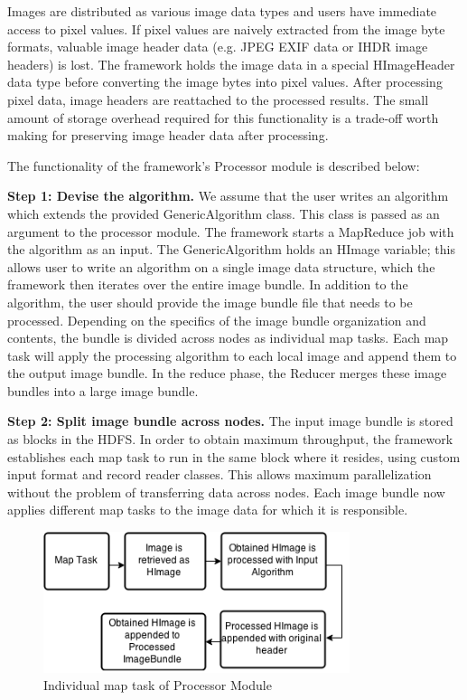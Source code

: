 \documentclass{osuthesis}
\begin{document}
				Images are distributed as various image data types and users have
				immediate access to pixel values.  If pixel values are naively
				extracted from the image byte formats, valuable image header data
				(e.g. JPEG EXIF data or IHDR \cite{David03} image headers) is
				lost. The framework holds the image data in a special HImageHeader
				data type before converting the image bytes into pixel values.  After
				processing pixel data, image headers are reattached to the processed
				results.  The small amount of storage overhead required for this
				functionality is a trade-off worth making for preserving
				image header data after processing.
				
				The functionality of the framework's Processor module is described
				below:
				
				\textbf{Step 1: Devise the algorithm.} We assume that the user writes
				an algorithm which extends the provided GenericAlgorithm class. This
				class is passed as an argument to the processor module. The framework
				starts a MapReduce job with the algorithm as an input. The
				GenericAlgorithm holds an HImage variable; this allows user to write
				an algorithm on a single image data structure, which the framework
				then iterates over the entire image bundle. In addition to the
				algorithm, the user should provide the image bundle file that needs to
				be processed.  Depending on the specifics of the image bundle
				organization and contents, the bundle is divided across nodes as
				individual map tasks. Each map task will apply the processing
				algorithm to each local image and append them to the output
				image bundle. In the reduce phase, the Reducer merges these image
				bundles into a large image bundle.
				
				\textbf{Step 2: Split image bundle across nodes.} The input image
				bundle is stored as blocks in the HDFS.  In order to obtain maximum
				throughput, the framework establishes each map task to run in the same
				block where it resides, using custom input format and record reader
				classes. This allows maximum parallelization without the problem of
				transferring data across nodes.  Each image bundle now applies
				different map tasks to the image data for which it is responsible.
				
				\begin{figure}[h]
					\centering
					\includegraphics[width=0.80\textwidth]{pro-map}
					\caption{Individual map task of Processor Module}
					\label{fig:pro-map}
				\end{figure}
				
\end{document}
